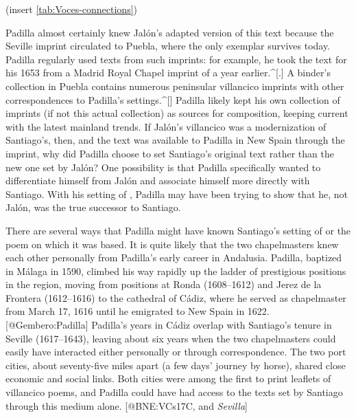 (insert \cref{tab:Voces-connections})
\label{tab:Voces-connections}

Padilla almost certainly knew Jalón's adapted version of this text because the
Seville imprint circulated to Puebla, where the only exemplar survives today.
Padilla regularly used texts from such imprints: for example, he took
the text for his 1653  from a Madrid Royal Chapel
imprint of a year earlier.^[.]
A binder's collection in Puebla contains numerous peninsular villancico imprints
with other correspondences to Padilla's settings.^[]
Padilla likely kept his own collection of imprints (if not this actual
collection) as sources for composition, keeping current with the latest mainland
trends.
If Jalón's villancico was a modernization of Santiago's, then, and the text was
available to Padilla in New Spain through the imprint, why did Padilla choose to
set Santiago's original text rather than the new one set by Jalón?
One possibility is that Padilla specifically wanted to differentiate himself
from Jalón and associate himself more directly with Santiago.
With his setting of , Padilla may have been trying to
show that he, not Jalón, was the true successor to Santiago.

There are several ways that Padilla might have known Santiago's setting of
 or the poem on which it was based.
It is quite likely that the two chapelmasters knew each other personally from
Padilla's early career in Andalusia.
Padilla, baptized in Málaga in 1590, climbed his way rapidly up the ladder of
prestigious positions in the region, moving from positions at Ronda (1608--1612)
and Jerez de la Frontera (1612--1616) to the cathedral of Cádiz, where he served
as chapelmaster from March 17, 1616 until he emigrated to New Spain in 1622.
[@Gembero:Padilla]
Padilla's years in Cádiz overlap with Santiago's tenure in Seville (1617--1643),
leaving about six years when the two chapelmasters could easily have interacted
either personally or through correspondence.
The two port cities, about seventy-five miles apart (a few days' journey by
horse), shared close economic and social links.
Both cities were among the first to print leaflets of villancico poems, and
Padilla could have had access to the texts set by Santiago through this medium
alone.
[@BNE:VCs17C,  and \emph{Sevilla}]

